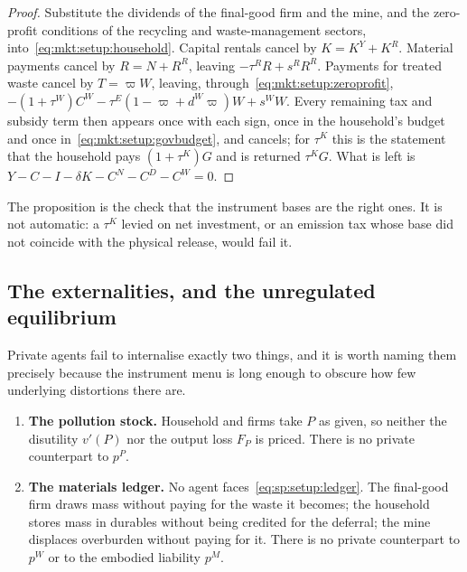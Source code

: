 \begin{proof}
Substitute the dividends of the final-good firm and the mine, and the zero-profit conditions of the
recycling and waste-management sectors, into~\eqref{eq:mkt:setup:household}. Capital rentals cancel by
$K=K^Y+K^R$. Material payments cancel by $R=N+R^R$, leaving $-\tau^RR+s^RR^R$. Payments for treated
waste cancel by $T=\varpi W$, leaving, through~\eqref{eq:mkt:setup:zeroprofit},
$-\left(1+\tau^W\right)C^W-\tau^E\left(1-\varpi+d^W\varpi\right)W+s^WW$. Every remaining tax and
subsidy term then appears once with each sign, once in the household's budget and once
in~\eqref{eq:mkt:setup:govbudget}, and cancels; for $\tau^K$ this is the statement that the household
pays $\left(1+\tau^K\right)G$ and is returned $\tau^KG$. What is left is
$Y-C-I-\delta K-C^N-C^D-C^W=0$.
\end{proof}

The proposition is the check that the instrument bases are the right ones. It is not automatic: a
$\tau^K$ levied on net investment, or an emission tax whose base did not coincide with the physical
release, would fail it.


\subsection{The externalities, and the unregulated equilibrium}\label{sec:mkt:setup:laissezfaire}

Private agents fail to internalise exactly two things, and it is worth naming them precisely because
the instrument menu is long enough to obscure how few underlying distortions there are.

\begin{enumerate}[label=\textbf{X\arabic*.},ref=X\arabic*,leftmargin=2.6em,itemsep=0.3em]
\item\label{ext:mkt:pollution} \textbf{The pollution stock.} Household and firms take $P$ as given,
so neither the disutility $v'(P)$ nor the output loss $F_P$ is priced. There is no private counterpart
to $p^P$.
\item\label{ext:mkt:ledger} \textbf{The materials ledger.} No agent faces~\eqref{eq:sp:setup:ledger}.
The final-good firm draws mass without paying for the waste it becomes; the household stores mass in
durables without being credited for the deferral; the mine displaces overburden without paying for it.
There is no private counterpart to $p^W$ or to the embodied liability $p^M$.
\end{enumerate}

